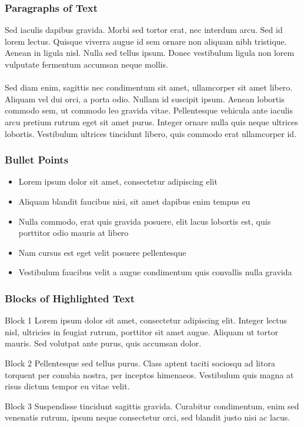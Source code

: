 \documentclass{beamer}
\begin{document}
\begin{frame}
\frametitle{Paragraphs of Text}
Sed iaculis dapibus gravida. Morbi sed tortor erat, nec interdum arcu. Sed id lorem lectus. Quisque viverra augue id sem ornare non aliquam nibh tristique. Aenean in ligula nisl. Nulla sed tellus ipsum. Donec vestibulum ligula non lorem vulputate fermentum accumsan neque mollis.\\~\\

Sed diam enim, sagittis nec condimentum sit amet, ullamcorper sit amet libero. Aliquam vel dui orci, a porta odio. Nullam id suscipit ipsum. Aenean lobortis commodo sem, ut commodo leo gravida vitae. Pellentesque vehicula ante iaculis arcu pretium rutrum eget sit amet purus. Integer ornare nulla quis neque ultrices lobortis. Vestibulum ultrices tincidunt libero, quis commodo erat ullamcorper id.
\end{frame}


\begin{frame}
\frametitle{Bullet Points}
\begin{itemize}
\item Lorem ipsum dolor sit amet, consectetur adipiscing elit
\item Aliquam blandit faucibus nisi, sit amet dapibus enim tempus eu
\item Nulla commodo, erat quis gravida posuere, elit lacus lobortis est, quis porttitor odio mauris at libero
\item Nam cursus est eget velit posuere pellentesque
\item Vestibulum faucibus velit a augue condimentum quis convallis nulla gravida
\end{itemize}
\end{frame}


\begin{frame}
\frametitle{Blocks of Highlighted Text}
\begin{block}{Block 1}
Lorem ipsum dolor sit amet, consectetur adipiscing elit. Integer lectus nisl, ultricies in feugiat rutrum, porttitor sit amet augue. Aliquam ut tortor mauris. Sed volutpat ante purus, quis accumsan dolor.
\end{block}

\begin{block}{Block 2}
Pellentesque sed tellus purus. Class aptent taciti sociosqu ad litora torquent per conubia nostra, per inceptos himenaeos. Vestibulum quis magna at risus dictum tempor eu vitae velit.
\end{block}

\begin{block}{Block 3}
Suspendisse tincidunt sagittis gravida. Curabitur condimentum, enim sed venenatis rutrum, ipsum neque consectetur orci, sed blandit justo nisi ac lacus.
\end{block}
\end{frame}
\end{document}

